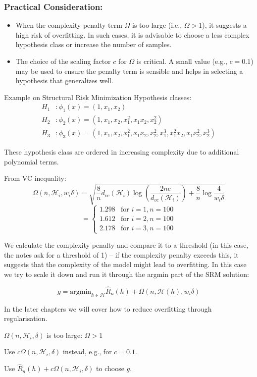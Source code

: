 \subsubsection*{Practical Consideration:}
\begin{itemize}
    \item When the complexity penalty term $\Omega$ is too large (i.e., $\Omega > 1$), it suggests a high risk of overfitting. In such cases, it is advisable to choose a less complex hypothesis class or increase the number of samples.
    \item The choice of the scaling factor $c$ for $\Omega$ is critical. A small value (e.g., $c = 0.1$) may be used to ensure the penalty term is sensible and helps in selecting a hypothesis that generalizes well.
\end{itemize}

\begin{examplebox}{Example on Structural Risk Minimization}
Hypothesis classes:
\begin{align*}
H_1 &: \phi_1(x) = (1, x_1, x_2) \\
H_2 &: \phi_2(x) = (1, x_1, x_2, x_1^2, x_1x_2, x_2^2) \\
H_3 &: \phi_3(x) = (1, x_1, x_2, x_1^2, x_1x_2, x_2^2, x_1^3, x_1^2x_2, x_1x_2^2, x_2^3)
\end{align*}

These hypothesis class are ordered in increasing complexity due to additional polynomial terms. 

From VC inequality:
\[
\Omega(n, \mathcal{H}_i, w_i \delta) = \sqrt{\frac{8}{n}d_{vc}(\mathcal{H}_i)\log\left(\frac{2ne}{d_{vc}(\mathcal{H}_i)}\right) + \frac{8}{n}\log\frac{4}{w_i\delta}}
\]
\[
= \begin{cases}
1.298 & \text{for } i = 1, n = 100 \\
1.612 & \text{for } i = 2, n = 100 \\
2.178 & \text{for } i = 3, n = 100
\end{cases}
\]

We calculate the complexity penalty and compare it to a threshold (in this case, the notes ask for a threshold of 1) – if the complexity penalty exceeds this, it suggests that the complexity of the model might lead to overfitting. In this case we try to scale it down and run it through the argmin part of the SRM solution:

    \[g = \text{argmin}_{h \in \mathcal{H}}\widehat{R}_n(h) + \Omega(n, \mathcal{H}(h), w_i\delta)\]

    In the later chapters we will cover how to reduce overfitting through regularisation.


$\Omega(n, \mathcal{H}_i, \delta)$ is too large: $\Omega > 1$

Use $c\Omega(n, \mathcal{H}_i, \delta)$ instead, e.g., for $c = 0.1$.

Use $\hat{R}_n(h) + c\Omega(n, \mathcal{H}_i, \delta)$ to choose $g$.
\end{examplebox}

